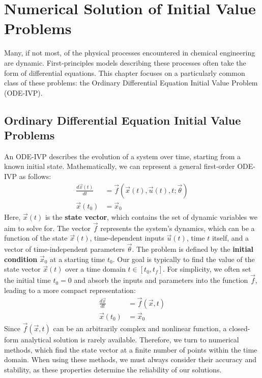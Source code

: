 \section{Numerical Solution of Initial Value Problems}
\label{sec:ode-ivp}

Many, if not most, of the physical processes encountered in chemical engineering are dynamic. First-principles models describing these processes often take the form of differential equations. This chapter focuses on a particularly common class of these problems: the Ordinary Differential Equation Initial Value Problem (ODE-IVP).

\subsection{Ordinary Differential Equation Initial Value Problems}
\label{subsec:ivp-intro}

An ODE-IVP describes the evolution of a system over time, starting from a known initial state. Mathematically, we can represent a general first-order ODE-IVP as follows:
\begin{align}
    \frac{d\vec{x}(t)}{dt} &= \vec{f}(\vec{x}(t), \vec{u}(t), t; \vec{\theta}) \\
    \vec{x}(t_0) &= \vec{x}_0
\end{align}
Here, $\vec{x}(t)$ is the \textbf{state vector}, which contains the set of dynamic variables we aim to solve for. The vector $\vec{f}$ represents the system's dynamics, which can be a function of the state $\vec{x}(t)$, time-dependent inputs $\vec{u}(t)$, time $t$ itself, and a vector of time-independent parameters $\vec{\theta}$. The problem is defined by the \textbf{initial condition} $\vec{x}_0$ at a starting time $t_0$. Our goal is typically to find the value of the state vector $\vec{x}(t)$ over a time domain $t \in [t_0, t_f]$. For simplicity, we often set the initial time $t_0 = 0$ and absorb the inputs and parameters into the function $\vec{f}$, leading to a more compact representation:
\begin{align}
    \frac{d\vec{x}}{dt} &= \vec{f}(\vec{x}, t) \\
    \vec{x}(t_0) &= \vec{x}_0
\end{align}
Since $\vec{f}(\vec{x}, t)$ can be an arbitrarily complex and nonlinear function, a closed-form analytical solution is rarely available. Therefore, we turn to numerical methods, which find the state vector at a finite number of points within the time domain. When using these methods, we must always consider their accuracy and stability, as these properties determine the reliability of our solutions.


